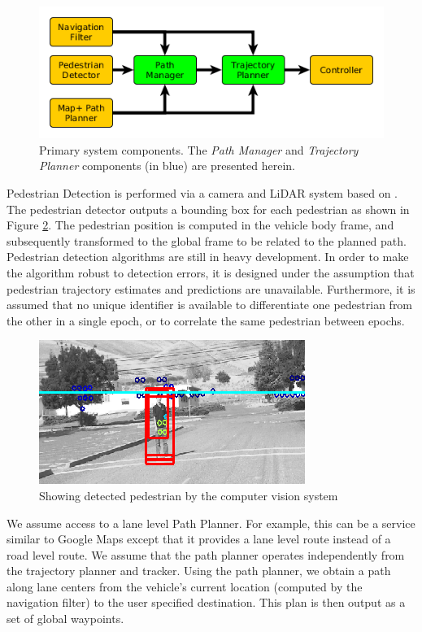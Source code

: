 \documentclass[letterpaper, 10 pt, conference]{ieeeconf}  %
\begin{document}
\begin{figure}[tb]
  \centering
  \includegraphics[width=1.0\columnwidth]{graphics/MissingReactionPiece2.png}
  \caption{
    Primary system components. The {\it Path Manager} and {\it Trajectory Planner} components (in blue) are presented herein.
  }
  \label{fig:addreact}
\end{figure}

Pedestrian Detection is performed via a camera and LiDAR system based on \cite{Gepperth2013,Gepperth2014}.
The pedestrian detector outputs a bounding box for each pedestrian as shown in Figure \ref{fig:ped}.
The pedestrian position is computed in the vehicle body frame, and subsequently transformed to the global frame to be related to the planned path.
Pedestrian detection algorithms are still in heavy development.
In order to make the algorithm robust to detection errors, it is designed under the assumption that pedestrian trajectory estimates and predictions are unavailable.
Furthermore, it is assumed that no unique identifier is available to differentiate one pedestrian from the other in a single epoch, or to correlate the same pedestrian between epochs.

\begin{figure}[tb]
  \centering
  \includegraphics[width=0.5\columnwidth]{graphics/ped3.png}
  \caption{Showing detected pedestrian by the computer vision system
  \newline
  }
  \label{fig:ped}
\end{figure}

We assume access to a lane level Path Planner. For example, this can be a service similar to Google Maps except that it provides a lane level route instead of a road level route. 
We assume that the path planner operates independently from the trajectory planner and tracker.
Using the path planner, we obtain a path along lane centers from the vehicle's current location (computed by the navigation filter) to the user specified destination.
This plan is then output as a set of global waypoints.
\end{document}
